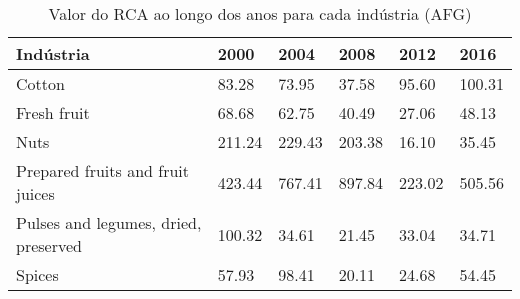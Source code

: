 \begin{table}
\centering
\caption{Valor do RCA ao longo dos anos para cada indústria (AFG)}
\label{tab:ex3-tempo-AFG}
\begin{tabular}{p{6cm}p{1.5cm}p{1.5cm}p{1.5cm}p{1.5cm}p{1.5cm}}
\toprule
                           Indústria &   2000 &   2004 &   2008 &   2012 &   2016 \\
\midrule
                              Cotton &  83.28 &  73.95 &  37.58 &  95.60 & 100.31 \\
                         Fresh fruit &  68.68 &  62.75 &  40.49 &  27.06 &  48.13 \\
                                Nuts & 211.24 & 229.43 & 203.38 &  16.10 &  35.45 \\
    Prepared fruits and fruit juices & 423.44 & 767.41 & 897.84 & 223.02 & 505.56 \\
Pulses and legumes, dried, preserved & 100.32 &  34.61 &  21.45 &  33.04 &  34.71 \\
                              Spices &  57.93 &  98.41 &  20.11 &  24.68 &  54.45 \\
\bottomrule
\end{tabular}
\end{table}
